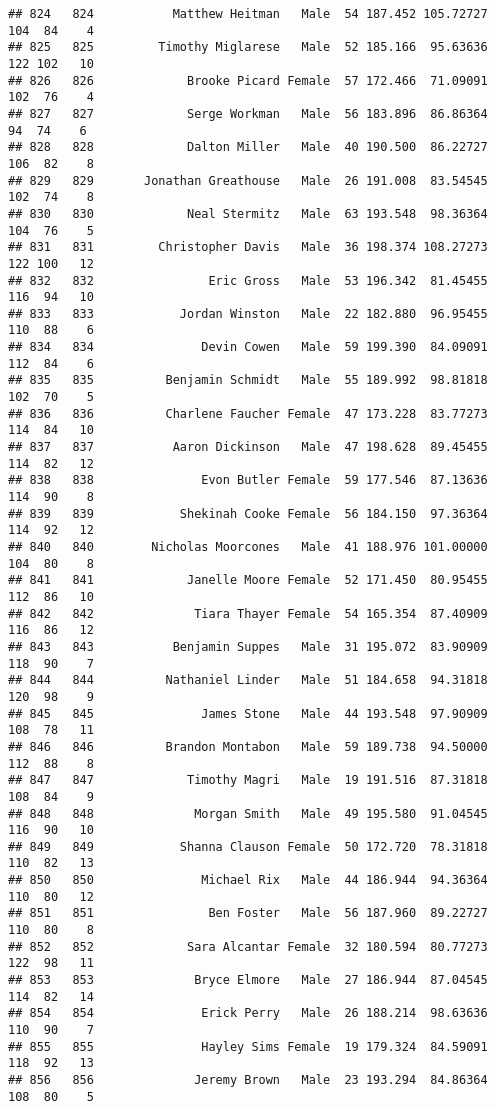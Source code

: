 \documentclass[
]{article}
\begin{document}
\begin{verbatim}
## 824   824           Matthew Heitman   Male  54 187.452 105.72727 104  84    4
## 825   825         Timothy Miglarese   Male  52 185.166  95.63636 122 102   10
## 826   826             Brooke Picard Female  57 172.466  71.09091 102  76    4
## 827   827             Serge Workman   Male  56 183.896  86.86364  94  74    6
## 828   828             Dalton Miller   Male  40 190.500  86.22727 106  82    8
## 829   829       Jonathan Greathouse   Male  26 191.008  83.54545 102  74    8
## 830   830             Neal Stermitz   Male  63 193.548  98.36364 104  76    5
## 831   831         Christopher Davis   Male  36 198.374 108.27273 122 100   12
## 832   832                Eric Gross   Male  53 196.342  81.45455 116  94   10
## 833   833            Jordan Winston   Male  22 182.880  96.95455 110  88    6
## 834   834               Devin Cowen   Male  59 199.390  84.09091 112  84    6
## 835   835          Benjamin Schmidt   Male  55 189.992  98.81818 102  70    5
## 836   836          Charlene Faucher Female  47 173.228  83.77273 114  84   10
## 837   837           Aaron Dickinson   Male  47 198.628  89.45455 114  82   12
## 838   838               Evon Butler Female  59 177.546  87.13636 114  90    8
## 839   839            Shekinah Cooke Female  56 184.150  97.36364 114  92   12
## 840   840        Nicholas Moorcones   Male  41 188.976 101.00000 104  80    8
## 841   841             Janelle Moore Female  52 171.450  80.95455 112  86   10
## 842   842              Tiara Thayer Female  54 165.354  87.40909 116  86   12
## 843   843           Benjamin Suppes   Male  31 195.072  83.90909 118  90    7
## 844   844          Nathaniel Linder   Male  51 184.658  94.31818 120  98    9
## 845   845               James Stone   Male  44 193.548  97.90909 108  78   11
## 846   846          Brandon Montabon   Male  59 189.738  94.50000 112  88    8
## 847   847             Timothy Magri   Male  19 191.516  87.31818 108  84    9
## 848   848              Morgan Smith   Male  49 195.580  91.04545 116  90   10
## 849   849            Shanna Clauson Female  50 172.720  78.31818 110  82   13
## 850   850               Michael Rix   Male  44 186.944  94.36364 110  80   12
## 851   851                Ben Foster   Male  56 187.960  89.22727 110  80    8
## 852   852             Sara Alcantar Female  32 180.594  80.77273 122  98   11
## 853   853              Bryce Elmore   Male  27 186.944  87.04545 114  82   14
## 854   854               Erick Perry   Male  26 188.214  98.63636 110  90    7
## 855   855               Hayley Sims Female  19 179.324  84.59091 118  92   13
## 856   856              Jeremy Brown   Male  23 193.294  84.86364 108  80    5

\end{verbatim}
\end{document}
